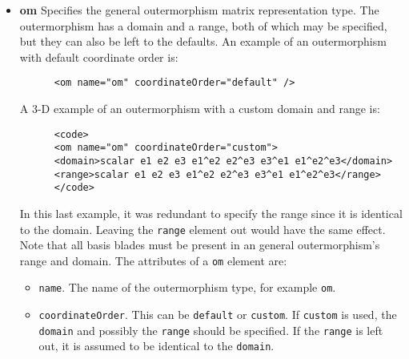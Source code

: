 \documentclass[10pt, a4paper]{article}
\begin{document}
\begin{itemize}
\item {\bf om} Specifies the general outermorphism matrix representation type. The outermorphism has a domain and
      a range, both of which may be specified, but they can also be left to the defaults. An example of an outermorphism with default
      coordinate order is:
      \begin{verbatim}
      <om name="om" coordinateOrder="default" />
      \end{verbatim}
      A 3-D example of an outermorphism with a custom domain and range is:
      \begin{verbatim}
      <code>
      <om name="om" coordinateOrder="custom">
      <domain>scalar e1 e2 e3 e1^e2 e2^e3 e3^e1 e1^e2^e3</domain>
      <range>scalar e1 e2 e3 e1^e2 e2^e3 e3^e1 e1^e2^e3</range>
      </code>
      \end{verbatim}
      In this last example, it was redundant to specify the range since it is identical to the domain. Leaving the {\tt range} element
      out would have the same effect. Note that all basis blades must be present in an general outermorphism's range and domain.
      The attributes of a {\tt om} element are:
       \begin{itemize}
       \item {\tt name}. The name of the outermorphism type, for example {\tt om}.
       \item {\tt coordinateOrder}. This can be {\tt default} or {\tt custom}. If {\tt custom} is used, the {\tt domain}
            and possibly the {\tt range} should be specified. If the {\tt range} is left out, it is assumed to be identical to the {\tt domain}.
       \end{itemize}
       

\end{itemize}
\end{document}
